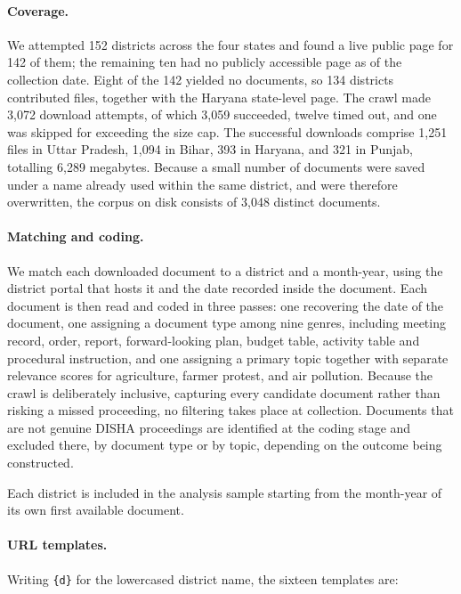 \documentclass[12pt]{article}
\begin{document}
\paragraph{Coverage.} We attempted 152 districts across the four states and found a live public page for 142 of them; the remaining ten had no publicly accessible page as of the collection date. Eight of the 142 yielded no documents, so 134 districts contributed files, together with the Haryana state-level page. The crawl made 3,072 download attempts, of which 3,059 succeeded, twelve timed out, and one was skipped for exceeding the size cap. The successful downloads comprise 1,251 files in Uttar Pradesh, 1,094 in Bihar, 393 in Haryana, and 321 in Punjab, totalling 6,289 megabytes. Because a small number of documents were saved under a name already used within the same district, and were therefore overwritten, the corpus on disk consists of 3,048 distinct documents.

\paragraph{Matching and coding.} We match each downloaded document to a district and a month-year, using the district portal that hosts it and the date recorded inside the document. Each document is then read and coded in three passes: one recovering the date of the document, one assigning a document type among nine genres, including meeting record, order, report, forward-looking plan, budget table, activity table and procedural instruction, and one assigning a primary topic together with separate relevance scores for agriculture, farmer protest, and air pollution. Because the crawl is deliberately inclusive, capturing every candidate document rather than risking a missed proceeding, no filtering takes place at collection. Documents that are not genuine DISHA proceedings are identified at the coding stage and excluded there, by document type or by topic, depending on the outcome being constructed.

Each district is included in the analysis sample starting from the month-year of its own first available document.

\paragraph{URL templates.} Writing \texttt{\{d\}} for the lowercased district name, the sixteen templates are:
\end{document}
